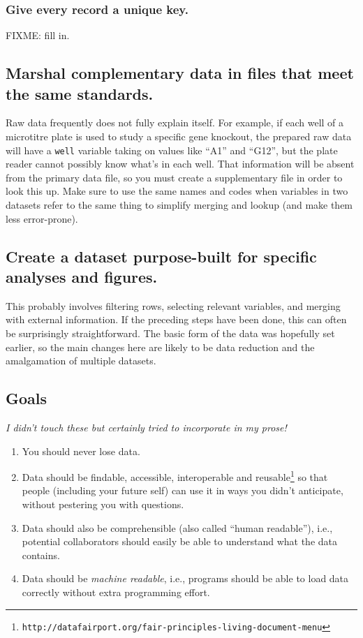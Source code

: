 \documentclass[10pt]{article}
\newcommand{\withurl}[2]{{#1}\footnote{\texttt{#2}}}
\begin{document}
\subsubsection*{Give every record a unique key.}

FIXME: fill in.

\subsection*{Marshal complementary data in files that meet the same standards.}

Raw data frequently does not fully explain itself. For example, if each
well of a microtitre plate is used to study a specific gene knockout,
the prepared raw data will have a \texttt{well} variable taking on
values like ``A1'' and ``G12'', but the plate reader cannot possibly
know what's in each well. That information will be absent from the
primary data file, so you must create a supplementary file in order to
look this up. Make sure to use the same names and codes when variables
in two datasets refer to the same thing to simplify merging and lookup
(and make them less error-prone).

\subsection*{Create a dataset purpose-built for specific analyses and figures.}

This probably involves filtering rows, selecting relevant variables, and
merging with external information. If the preceding steps have been
done, this can often be surprisingly straightforward. The basic form of
the data was hopefully set earlier, so the main changes here are likely
to be data reduction and the amalgamation of multiple datasets.

\subsection*{Goals}

\emph{I didn't touch these but certainly tried to incorporate in my prose!}

\begin{enumerate}
\item
  You should never lose data.
\item
  Data should be \withurl{findable, accessible, interoperable and
    reusable}{http://datafairport.org/fair-principles-living-document-menu}
  so that people (including your future self) can use it in ways you
  didn't anticipate, without pestering you with questions.
\item
  Data should also be comprehensible (also called ``human readable''),
  i.e., potential collaborators should easily be able to understand what
  the data contains.
\item
  Data should be \emph{machine readable}, i.e., programs should be able
  to load data correctly without extra programming effort.
\end{enumerate}
\end{document}
